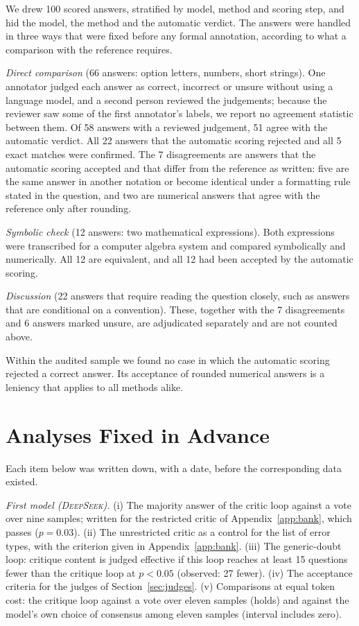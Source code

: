 \documentclass[11pt]{article}
\newcommand{\ds}{\textsc{DeepSeek}}
\begin{document}
We drew 100 scored answers, stratified by model, method and scoring step, and hid the model, the method and the automatic verdict.
The answers were handled in three ways that were fixed before any formal annotation, according to what a comparison with the reference requires.

\emph{Direct comparison} (66 answers: option letters, numbers, short strings).
One annotator judged each answer as correct, incorrect or unsure without using a language model, and a second person reviewed the judgements; because the reviewer saw some of the first annotator's labels, we report no agreement statistic between them.
Of 58 answers with a reviewed judgement, 51 agree with the automatic verdict.
All 22 answers that the automatic scoring rejected and all 5 exact matches were confirmed.
The 7 disagreements are answers that the automatic scoring accepted and that differ from the reference as written: five are the same answer in another notation or become identical under a formatting rule stated in the question, and two are numerical answers that agree with the reference only after rounding.

\emph{Symbolic check} (12 answers: two mathematical expressions).
Both expressions were transcribed for a computer algebra system and compared symbolically and numerically.
All 12 are equivalent, and all 12 had been accepted by the automatic scoring.

\emph{Discussion} (22 answers that require reading the question closely, such as answers that are conditional on a convention).
These, together with the 7 disagreements and 6 answers marked unsure, are adjudicated separately and are not counted above.

Within the audited sample we found no case in which the automatic scoring rejected a correct answer.
Its acceptance of rounded numerical answers is a leniency that applies to all methods alike.

\section{Analyses Fixed in Advance}
\label{app:prereg}

Each item below was written down, with a date, before the corresponding data existed.

\emph{First model (\ds).}
(i) The majority answer of the critic loop against a vote over nine samples; written for the restricted critic of Appendix~\ref{app:bank}, which passes ($p=0.03$).
(ii) The unrestricted critic as a control for the list of error types, with the criterion given in Appendix~\ref{app:bank}.
(iii) The generic-doubt loop: critique content is judged effective if this loop reaches at least 15 questions fewer than the critique loop at $p<0.05$ (observed: 27 fewer).
(iv) The acceptance criteria for the judges of Section~\ref{sec:judges}.
(v) Comparisons at equal token cost: the critique loop against a vote over eleven samples (holds) and against the model's own choice of consensus among eleven samples (interval includes zero).
\end{document}
